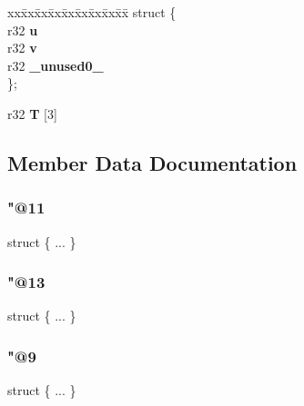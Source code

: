 \begin{DoxyCompactItemize}
\begin{tabbing}
\end{tabbing}\item 
\mbox{\label{unionv3_a2430c4224c4c4968fc4f1df551d020f0}} 
\begin{tabbing}
xx\=xx\=xx\=xx\=xx\=xx\=xx\=xx\=xx\=\kill
struct \{\\
\mbox{\label{unionv3_a56424ff9841c962637ce7a2d2acf74a9}} 
r32 {\bfseries u}\\
\mbox{\label{unionv3_a2c5c7f763c1c777bac0d5b63f32ae1e7}} 
r32 {\bfseries v}\\
\mbox{\label{unionv3_ad21942f0dc88f855204a7aad106239a2}} 
r32 {\bfseries \_unused0\_}\\
\}; \\

\end{tabbing}\item 
\mbox{\label{unionv3_ad051a9bd43b49b2e6c83d885a746d799}} 
r32 {\bfseries T} \mbox{[}3\mbox{]}
\end{DoxyCompactItemize}


\subsection{Member Data Documentation}
\mbox{\label{unionv3_a07850aa927870005a428fd9e58590999}} 
\subsubsection{\texorpdfstring{"@11}{@11}}
{\footnotesize\ttfamily struct \{ ... \} }

\mbox{\label{unionv3_a2430c4224c4c4968fc4f1df551d020f0}} 
\subsubsection{\texorpdfstring{"@13}{@13}}
{\footnotesize\ttfamily struct \{ ... \} }

\mbox{\label{unionv3_aabbcebeeee0968227b858381386e1bea}} 
\subsubsection{\texorpdfstring{"@9}{@9}}
{\footnotesize\ttfamily struct \{ ... \} }

